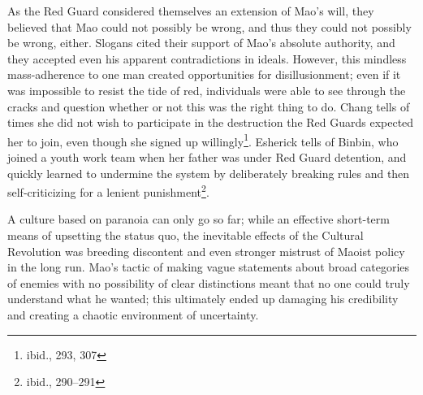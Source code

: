 As the Red Guard considered themselves an extension of Mao's will, they believed
that Mao could not possibly be wrong, and thus they could not possibly be wrong,
either. Slogans cited their support of Mao's absolute authority, and they
accepted even his apparent contradictions in ideals. However, this mindless
mass-adherence to one man created opportunities for disillusionment; even if it
was impossible to resist the tide of red, individuals were able to see through
the cracks and question whether or not this was the right thing to do. Chang
tells of times she did not wish to participate in the destruction the Red Guards
expected her to join, even though she signed up willingly\footnote{ibid., 293,
307}. Esherick tells of Binbin, who joined a youth work team when her father was
under Red Guard detention, and quickly learned to undermine the system by
deliberately breaking rules and then self-criticizing for a lenient
punishment\footnote{ibid., 290--291}.

A culture based on paranoia can only go so far; while an effective short-term
means of upsetting the status quo, the inevitable effects of the Cultural
Revolution was breeding discontent and even stronger mistrust of Maoist policy
in the long run. Mao's tactic of making vague statements about broad categories
of enemies with no possibility of clear distinctions meant that no one could
truly understand what he wanted; this ultimately ended up damaging his
credibility and creating a chaotic environment of uncertainty.
